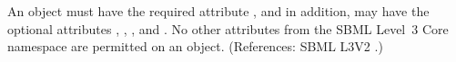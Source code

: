 An \Event object must have the required attribute
, and in addition, may have the optional
attributes  , , , and .
No other attributes from the SBML Level~3 Core namespace are permitted on
an \Event object.  (References: SBML L3V2 .)
